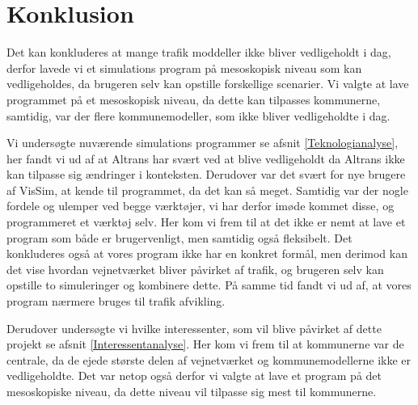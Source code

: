 \chapter{Konklusion} %
Det kan konkluderes at mange trafik moddeller ikke bliver vedligeholdt i dag, derfor lavede vi et simulations program på mesoskopisk niveau som kan vedligeholdes, da brugeren selv kan opstille forskellige scenarier. Vi valgte at lave programmet på et mesoskopisk niveau, da dette kan tilpasses kommunerne, samtidig, var der flere kommunemodeller, som ikke bliver vedligeholdte i dag.

\vspace{5mm}

Vi undersøgte nuværende simulations programmer se afsnit \ref{Teknologianalyse}, her fandt vi ud af at Altrans har svært ved at blive vedligeholdt da Altrans ikke kan tilpasse sig ændringer i konteksten. Derudover var det svært for nye brugere af VisSim, at kende til programmet, da det kan så meget. Samtidig var der nogle fordele og ulemper ved begge værktøjer, vi har derfor imøde kommet disse, og programmeret et værktøj selv. Her kom vi frem til at det ikke er nemt at lave et program som både er brugervenligt, men samtidig også fleksibelt. Det konkluderes også at vores program ikke har en konkret formål, men derimod kan det vise hvordan vejnetværket bliver påvirket af trafik, og brugeren selv kan opstille to simuleringer og kombinere dette. På samme tid fandt vi ud af, at vores program nærmere bruges til trafik afvikling.

Derudover undersøgte vi hvilke interessenter, som vil blive påvirket af dette projekt se afsnit \ref{Interessentanalyse}. Her kom vi frem til at kommunerne var de centrale, da de ejede største delen af vejnetværket og kommunemodellerne ikke er vedligeholdte. Det var netop også derfor vi valgte at lave et program på det mesoskopiske niveau, da dette niveau vil tilpasse sig mest til kommunerne. 